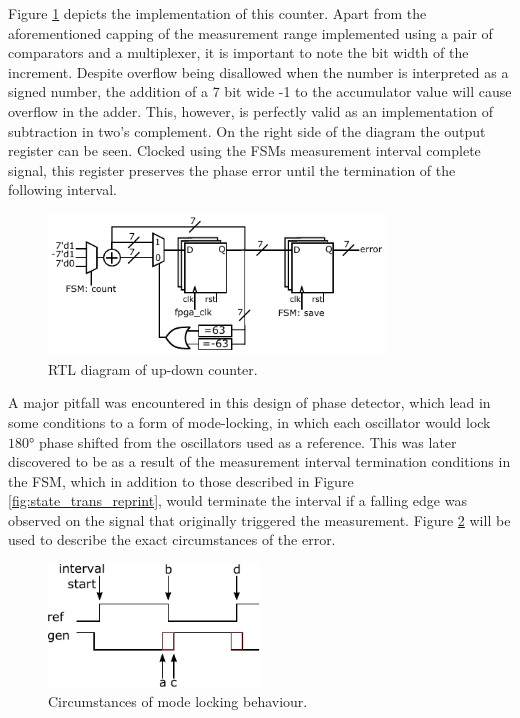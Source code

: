 Figure \ref{fig:updown_ctr} depicts the implementation of this counter. Apart from the aforementioned capping of the measurement range implemented using a pair of comparators and a multiplexer, it is important to note the bit width of the increment. Despite overflow being disallowed when the number is interpreted as a signed number, the addition of a 7 bit wide -1 to the accumulator value will cause overflow in the adder. This, however, is perfectly valid as an implementation of subtraction in two's complement. On the right side of the diagram the output register can be seen. Clocked using the \acp{FSM} measurement interval complete signal, this register preserves the phase error until the termination of the following interval.
\begin{figure}[h]
    \centering
    \includegraphics[width=0.8\textwidth]{../updown}
    \caption[\ac{RTL} diagram of up-down counter]{\ac{RTL} diagram of up-down counter.}
    \label{fig:updown_ctr}
\end{figure}

A major pitfall was encountered in this design of phase detector, which lead in some conditions to a form of mode-locking, in which each oscillator would lock $180\si{\degree}$ phase shifted from the oscillators used as a reference. This was later discovered to be as a result of the measurement interval termination conditions in the \ac{FSM}, which in addition to those described in Figure \ref{fig:state_trans_reprint}, would terminate the interval if a falling edge was observed on the signal that originally triggered the measurement. Figure \ref{fig:uncertainty} will be used to describe the exact circumstances of the error.
\begin{figure}[h]
    \centering
    \includegraphics[width=0.5\textwidth]{../uncertain}
    \caption[Circumstances of mode locking behaviour]{Circumstances of mode locking behaviour.}
    \label{fig:uncertainty}
\end{figure}

